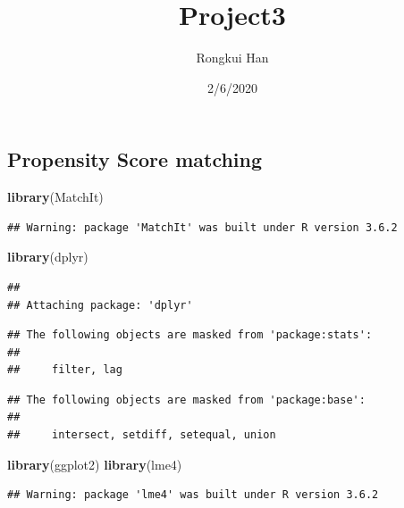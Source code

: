 \documentclass[]{article}
\title{Project3}
\author{Rongkui Han}
\date{2/6/2020}
\newenvironment{Shaded}{\begin{snugshade}}{\end{snugshade}}
\newcommand{\KeywordTok}[1]{\textcolor[rgb]{0.13,0.29,0.53}{\textbf{#1}}}
\newcommand{\NormalTok}[1]{#1}
\begin{document}
\maketitle

\hypertarget{propensity-score-matching}{%
\subsection{Propensity Score matching}\label{propensity-score-matching}}

\begin{Shaded}
\begin{Highlighting}[]
\KeywordTok{library}\NormalTok{(MatchIt)}
\end{Highlighting}
\end{Shaded}

\begin{verbatim}
## Warning: package 'MatchIt' was built under R version 3.6.2
\end{verbatim}

\begin{Shaded}
\begin{Highlighting}[]
\KeywordTok{library}\NormalTok{(dplyr)}
\end{Highlighting}
\end{Shaded}

\begin{verbatim}
## 
## Attaching package: 'dplyr'
\end{verbatim}

\begin{verbatim}
## The following objects are masked from 'package:stats':
## 
##     filter, lag
\end{verbatim}

\begin{verbatim}
## The following objects are masked from 'package:base':
## 
##     intersect, setdiff, setequal, union
\end{verbatim}

\begin{Shaded}
\begin{Highlighting}[]
\KeywordTok{library}\NormalTok{(ggplot2)}
\KeywordTok{library}\NormalTok{(lme4)}
\end{Highlighting}
\end{Shaded}

\begin{verbatim}
## Warning: package 'lme4' was built under R version 3.6.2
\end{verbatim}
\end{document}
